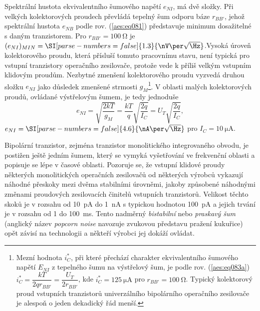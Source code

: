         Spektrální hustota ekvivalentního šumového napětí \(e_{NI}\), má dvě složky. Při velkých
        kolektorových proudech převládá tepelný šum odporu báze \(r_{BB'}\), jehož spektrální
        hustota \(e_{NB}\) podle rov. (\ref{aes:eq081}) představuje minimum dosažitelné s daným
        tranzistorem. Pro \(r_{BB'} = \qty{100}{\ohm}\) je \((e_{NI})_{MIN} = \SI[parse-numbers =
        false]{1.3}{\nV\per\sqrt{\Hz}}\).Vysoká úroveň kolektorového proudu, která přísluší tomuto
        pracovnímu stavu, není typická pro vstupní tranzistory operačního zesilovače, protože vede k
        příliš velkým vstupním klidovým proudům. Nezbytné zmenšení kolektorového proudu vyzvedá
        druhou složku \(e_{NI}\) jako důsledek zmenšené strmosti \(g_{M}\)\footnote{Mezní hodnota
        \(i^*_C\), při které přechází charakter ekvivalentního šumového napětí \(E_{NI}\) z
        tepelného šumu na výstřelový šum, je podle rov. (\ref {aes:eq083a}) \(i^*_C =
        \dfrac{kT}{2qr_{BB'}} = \dfrac{U_T}{2r_{BB'}}\), kde \(i^*_C = \qty{125}{\uA}\) pro \(r_{BB'}
        = \qty{100}{\ohm}\). Typický kolektorový proud vstupních tranzistorů univerzálního
        bipolárního operačního zesilovače je alespoň o jeden dekadický řád menší.}. V oblasti malých
        kolektorových proudů, ovládané výstřelovým šumem, je tedy jednoduše
        \begin{equation}\label{aes:eq084}
          e_{NI} = \sqrt{\dfrac{2kT}{g_M}} = \dfrac{kT}{q}\sqrt{\dfrac{2q}{I_C}} 
                = U_T\sqrt{\dfrac{2q}{I_C}},
        \end{equation} 
        \(e_{NI} = \SI[parse-numbers = false]{4.6}{\nA\per\sqrt{\Hz}}\) pro \(I_C = \qty{10}{\uA}\).

        Bipolární tranzistor, zejména tranzistor monolitického integrovaného obvodu, je postižen
        ještě jedním šumem, který se vymyká vyšetřování ve frekvenční oblasti a popisuje se lépe v
        časové oblasti. Pozoruje se, že vstupní klidové proudy některých monolitických operačních
        zesilovačů od některých výrobců vykazují náhodné přeskoky mezi dvěma stabilními úrovněmi,
        jakoby způsobené náhodnými změnami proudových zesilovacích činitelů vstupních tranzistorů.
        Velikost těchto skoků je v rozsahu od \qty{10}{\pA} do \qty{1}{\nA} s typickou hodnotou
        \qty{100}{\pA} a jejich trvání je v rozsahu od 1 do \qty{100}{\ms}. Tento nadměrný
        \emph{bistabilní} nebo \emph{praskavý šum} (anglický název \emph{popcorn noise} navozuje
        zvukovou představu pražení kukuřice) opět závisí na technologii a někteří výrobci jej dokáží
        ovládat.

